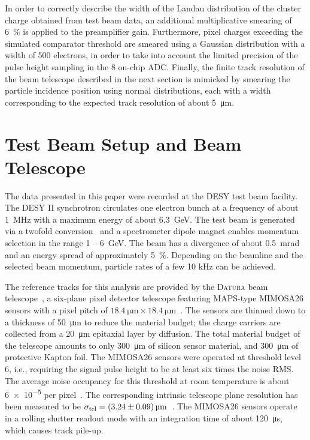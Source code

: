 \documentclass[a4paper,11pt]{article}
\newcommand{\datura}{\textsc{Datura}\xspace}
\begin{document}
In order to correctly describe the width of the Landau distribution of the cluster charge obtained from test beam data, an additional multiplicative smearing of \SI{6}{\percent} is applied to the preamplifier gain.
Furthermore, pixel charges exceeding the simulated comparator threshold are smeared using a Gaussian distribution with a width of 500 electrons, in order to take into account the limited precision of the pulse height sampling in the \SI{8}{\bit} on-chip ADC.
Finally, the finite track resolution of the beam telescope described in the next section is mimicked by smearing the particle incidence position using normal distributions, each with a width corresponding to the expected track resolution of about \SI{5}{\um}.


\section{Test Beam Setup and Beam Telescope}
\label{sec:testbeam}

The data presented in this paper were recorded at the DESY test beam facility. 
The DESY II synchrotron circulates one electron bunch at a frequency of about \SI{1}{\MHz} with a maximum energy of about \SI{6.3}{\GeV}.
The test beam is generated via a twofold conversion~\cite{eudet-memo-2007-11} and a spectrometer dipole magnet enables momentum selection in the range 1 -- \SI{6}{\GeV}.
The beam has a divergence of about \SI{0.5}{mrad} and an energy spread of approximately \SI{5}{\percent}.
Depending on the beamline and the selected beam momentum, particle rates of a few 10 kHz can be achieved.

The reference tracks for this analysis are provided by the \datura beam telescope~\cite{datura-paper}, a six-plane pixel detector telescope featuring MAPS-type MIMOSA26 sensors with a pixel pitch of $\SI{18.4}{\micro \meter} \times \SI{18.4}{\micro \meter}$~\cite{HuGuo2010480}.
The sensors are thinned down to a thickness of \SI{50}{\micro \meter} to reduce the material budget; the charge carriers are collected from a \SI{20}{\micro\meter} epitaxial layer by diffusion.
The total material budget of the telescope amounts to only \SI{300}{\micro\meter} of silicon sensor material, and \SI{300}{\micro\meter} of protective Kapton foil.
The MIMOSA26 sensors were operated at threshold level 6, i.e., requiring the signal pulse height to be at least six times the noise RMS.
The average noise occupancy for this threshold at room temperature is about \num{6e-5} per pixel~\cite{mimosa26}.
The corresponding intrinsic telescope plane resolution has been measured to be $\sigma_{\mathrm{tel}} = \SI{3.24\pm0.09}{\micro\meter}$~\cite{datura-paper}.
The MIMOSA26 sensors operate in a rolling shutter readout mode with an integration time of about \SI{120}{\micro\second}, which causes track pile-up.
\end{document}
